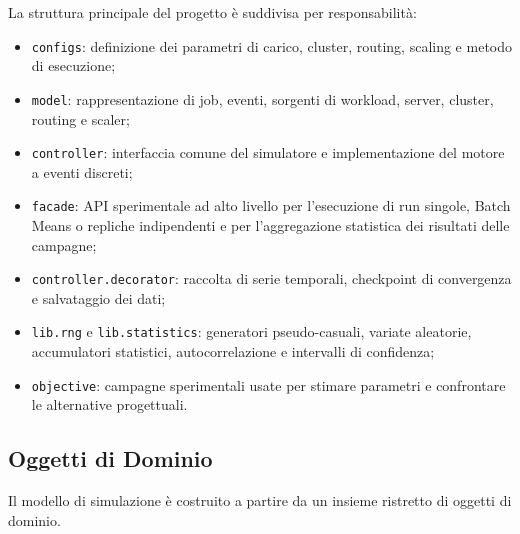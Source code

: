 ﻿\documentclass[a4paper,12pt]{article}
\begin{document}
La struttura principale del progetto è suddivisa per responsabilità:
\begin{itemize}
    \item \texttt{configs}: definizione dei parametri di carico, cluster, routing, scaling e metodo di esecuzione;
    \item \texttt{model}: rappresentazione di job, eventi, sorgenti di workload, server, cluster, routing e scaler;
    \item \texttt{controller}: interfaccia comune del simulatore e implementazione del motore a eventi discreti;
    \item \texttt{facade}: API sperimentale ad alto livello per l'esecuzione di run singole, Batch Means o repliche indipendenti e per l'aggregazione statistica dei risultati delle campagne;
    \item \texttt{controller.decorator}: raccolta di serie temporali, checkpoint di convergenza e salvataggio dei dati;
    \item \texttt{lib.rng} e \texttt{lib.statistics}: generatori pseudo-casuali, variate aleatorie, accumulatori statistici, autocorrelazione e intervalli di confidenza;
    \item \texttt{objective}: campagne sperimentali usate per stimare parametri e confrontare le alternative progettuali.
\end{itemize}

\subsection{Oggetti di Dominio}
Il modello di simulazione è costruito a partire da un insieme ristretto di oggetti di dominio.
\end{document}
